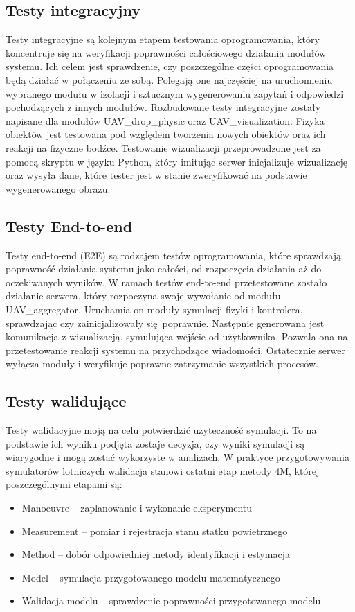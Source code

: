 \documentclass[15pt]{sprawozdanie}
\begin{document}
\subsection{Testy integracyjny}

Testy integracyjne są kolejnym etapem testowania oprogramowania, który koncentruje się na weryfikacji poprawności całościowego działania modułów systemu. Ich celem jest sprawdzenie, czy poszczególne części oprogramowania będą działać w połączeniu ze sobą. Polegają one najczęściej na uruchomieniu wybranego modułu w izolacji i sztucznym wygenerowaniu zapytań i odpowiedzi pochodzących z innych modułów. Rozbudowane testy integracyjne zostały napisane dla modułów UAV\_drop\_physic oraz UAV\_visualization. Fizyka obiektów jest testowana pod względem tworzenia nowych obiektów oraz ich reakcji na fizyczne bodźce. Testowanie wizualizacji przeprowadzone jest za pomocą skryptu w języku Python, który imitując serwer inicjalizuje wizualizację oraz wysyła dane, które tester jest w stanie zweryfikować na podstawie wygenerowanego obrazu.

\subsection{Testy End-to-end}

Testy end-to-end (E2E) są rodzajem testów oprogramowania, które sprawdzają poprawność działania systemu jako całości, od rozpoczęcia działania aż do oczekiwanych wyników. W ramach testów end-to-end przetestowane zostało działanie serwera, który rozpoczyna swoje wywołanie od modułu UAV\_aggregator. Uruchamia on moduły symulacji fizyki i kontrolera, sprawdzając czy zainicjalizowały się poprawnie. 
Następnie generowana jest komunikacja z wizualizacją, symulująca wejście od użytkownika. Pozwala ona na przetestowanie reakcji systemu na przychodzące wiadomości.
Ostatecznie serwer wyłącza moduły i weryfikuje poprawne zatrzymanie wszystkich procesów. 

\subsection{Testy walidujące}

Testy walidacyjne moją na celu potwierdzić użyteczność symulacji. To na podstawie ich wyniku podjęta zostaje decyzja, czy wyniki symulacji są wiarygodne i mogą zostać wykorzyste w analizach. W praktyce przygotowywania symulatorów lotniczych walidacja stanowi ostatni etap metody 4M, której poszczególnymi etapami są:
\begin{itemize}[noitemsep]
\item Manoeuvre -- zaplanowanie i wykonanie eksperymentu
\item Measurement -- pomiar i rejestracja stanu statku powietrznego
\item Method -- dobór odpowiedniej metody identyfikacji i estymacja
\item Model -- symulacja przygotowanego modelu matematycznego
\item Walidacja modelu -- sprawdzenie poprawności przygotowanego modelu
\end{itemize}
\end{document}
